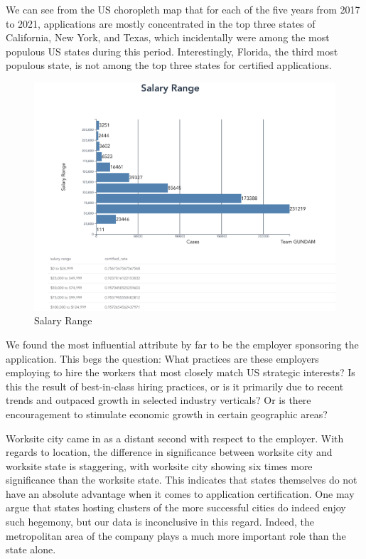 \documentclass[sigconf]{acmart}
\begin{document}
We can see from the US choropleth map that for each of the five years 
from 2017 to 2021, 
applications are mostly 
concentrated in the top three states of California, 
New York, and Texas, which incidentally were among the most populous 
US states during this period. 
Interestingly, Florida, the third most populous state, is not among the 
top three states for 
certified applications. 



\begin{figure}
  \includegraphics[width=\linewidth]{salary_range.png}
  \caption{Salary Range}
  \label{fig:salaryrange}
\end{figure}


We found the most influential attribute by far to be the employer sponsoring 
the application. This begs the question: What practices are these employers employing 
to hire the workers that most closely match US strategic interests? 
Is this the result of best-in-class hiring practices, or is it primarily due to 
recent trends and outpaced growth in selected industry verticals? 
Or is there encouragement to stimulate economic growth in certain geographic areas? 


Worksite city came in as a distant second with respect to the employer. 
With regards to location, the difference in significance between worksite city 
and worksite state is staggering, with worksite city showing six times more significance 
than the worksite state. This indicates that states themselves do not have an absolute advantage 
when it comes to application certification. One may argue that states hosting clusters of 
the more successful cities do indeed enjoy such hegemony, but our data is inconclusive in this regard.
Indeed, the metropolitan area of the company plays a much more important role than the state alone. 
\end{document}
